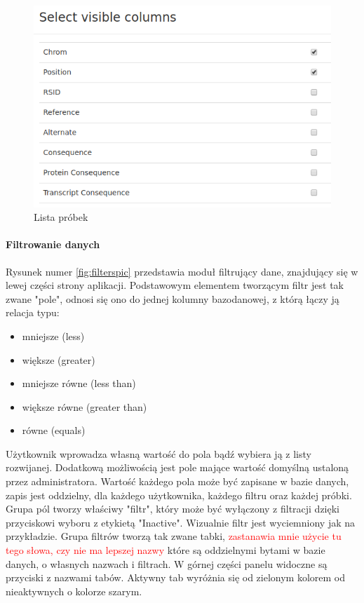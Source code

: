 \documentclass[a4paper,12pt,twoside]{article}
\begin{document}
\begin{figure}[h!]
  \includegraphics[width=\linewidth]{obrazy/aplikacja/visible_columns.png}
  \caption{Lista próbek}
  \label{fig:visible_columnspic}
\end{figure}
\newpage

\paragraph{Filtrowanie danych}
Rysunek numer \ref{fig:filterspic} przedstawia moduł filtrujący dane, znajdujący się w
lewej części strony aplikacji.
Podstawowym elementem tworzącym filtr jest tak zwane "pole", odnosi się ono do jednej kolumny
bazodanowej, z którą łączy ją relacja typu: 

\begin{itemize}
\item mniejsze (less)
\item większe (greater)
\item mniejsze równe (less than)
\item większe równe (greater than)
\item równe (equals)
\end{itemize} 

Użytkownik wprowadza własną wartość do pola bądź wybiera ją z listy rozwijanej.   
Dodatkową możliwością jest pole mające wartość domyślną ustaloną przez administratora. 
Wartość każdego pola może być zapisane w bazie danych, zapis jest oddzielny, dla każdego 
użytkownika, każdego filtru oraz każdej próbki.
Grupa pól tworzy właściwy "filtr", który może być wyłączony z filtracji dzięki
przyciskowi wyboru z etykietą "Inactive". Wizualnie filtr jest wyciemniony jak na przykładzie.
Grupa filtrów tworzą tak zwane tabki, \textcolor{red}{zastanawia mnie użycie tu tego słowa, czy nie ma lepszej nazwy} które są oddzielnymi bytami w bazie danych, o własnych nazwach i filtrach.
W górnej części panelu widoczne są przyciski z nazwami tabów. Aktywny tab
wyróżnia się od zielonym kolorem od nieaktywnych o kolorze szarym. 
\end{document}
